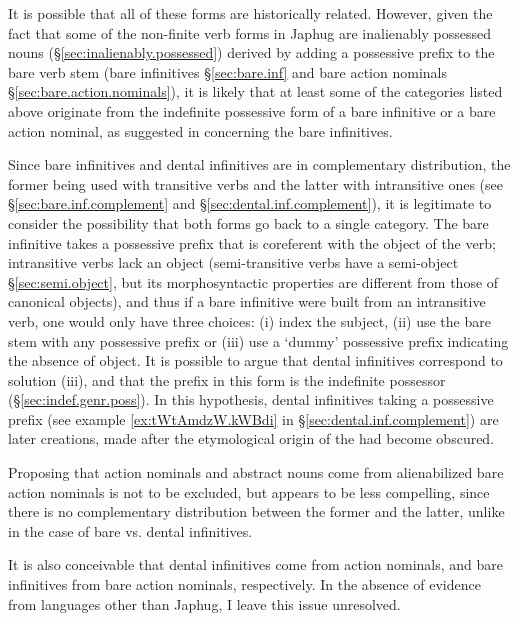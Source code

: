 It is possible that all of these forms are historically related. However, given the fact that some of the non-finite verb forms in Japhug are inalienably possessed nouns (§\ref{sec:inalienably.possessed}) derived by adding a possessive prefix to the bare verb stem (bare infinitives §\ref{sec:bare.inf} and bare action nominals §\ref{sec:bare.action.nominals}), it is likely that at least some of the categories listed above originate from the indefinite possessive form of a bare infinitive or a bare action nominal, as suggested in \citet[236]{jacques16complementation} concerning the bare infinitives. 

Since bare infinitives and dental infinitives are in complementary distribution, the former being used with transitive verbs and the latter with intransitive ones (see §\ref{sec:bare.inf.complement} and §\ref{sec:dental.inf.complement}), it is legitimate to consider the possibility that both forms go back to a single category.  The bare infinitive takes a possessive prefix that is coreferent with the object of the verb; intransitive verbs lack an object (semi-transitive verbs have a semi-object §\ref{sec:semi.object}, but its morphosyntactic properties are different from those of canonical objects), and thus if a bare infinitive were built from an intransitive verb, one would only have three choices: (i) index the subject, (ii) use the bare stem with any possessive prefix or (iii) use a `dummy' possessive prefix indicating the absence of object. It is possible to argue that dental infinitives correspond to solution (iii), and that the  prefix in this form is the indefinite possessor  (§\ref{sec:indef.genr.poss}). In this hypothesis, dental infinitives taking a possessive prefix (see example \ref{ex:tWtAmdzW.kWBdi} in §\ref{sec:dental.inf.complement}) are later creations, made after the etymological origin of the  had become obscured.

Proposing that  action nominals and  abstract nouns come from alienabilized bare action nominals is not to be excluded, but appears to be less compelling, since there is no complementary distribution between the former and the latter, unlike in the case of bare vs. dental infinitives.

It is also conceivable that dental infinitives come from  action nominals, and bare infinitives from bare action nominals, respectively. In the absence of evidence from languages other than Japhug, I leave this issue unresolved.

